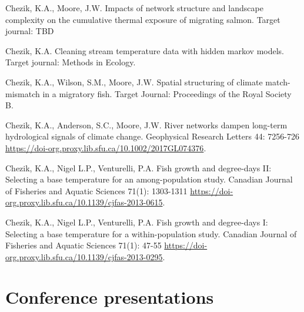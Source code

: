 \begin{description}
\tightlist

\item[\textit{In prep}] Chezik, K.A., Moore, J.W. Impacts of network structure and landscape complexity on the cumulative thermal exposure of migrating salmon. Target journal: TBD
\item[\textit{In prep}] Chezik, K.A. Cleaning stream temperature data with hidden markov models. Target journal: Methods in Ecology.
\item[\textit{In prep}] Chezik, K.A., Wilson, S.M., Moore, J.W. Spatial structuring of climate match-mismatch in a migratory fish. Target Journal: Proceedings of the Royal Society B.
\item[2017] Chezik, K.A., Anderson, S.C., Moore, J.W. River networks dampen long-term hydrological signals of climate change. Geophysical Research Letters 44: 7256-726 \url{https://doi-org.proxy.lib.sfu.ca/10.1002/2017GL074376}.
\item[2014] Chezik, K.A., Nigel L.P., Venturelli, P.A. Fish growth and degree-days II: Selecting a base temperature for an among-population study. Canadian Journal of Fisheries and Aquatic Sciences 71(1): 1303-1311 \url{https://doi-org.proxy.lib.sfu.ca/10.1139/cjfas-2013-0615}.
\item[2014] Chezik, K.A., Nigel L.P., Venturelli, P.A. Fish growth and degree-days I: Selecting a base temperature for a within-population study. Canadian Journal of Fisheries and Aquatic Sciences 71(1): 47-55 \url{https://doi-org.proxy.lib.sfu.ca/10.1139/cjfas-2013-0295}.

\end{description}



\section{Conference presentations}

